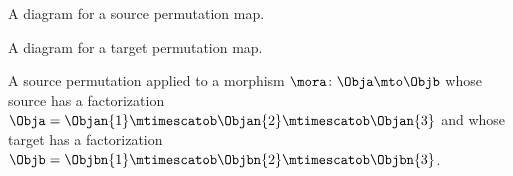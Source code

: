 \begin{marginfigure}
    \centering
    \caption{A diagram for a source permutation map.}
    \label{fig:symmetric-stacking-left-perm}
\end{marginfigure}

\begin{marginfigure}
    \centering
    \caption{A diagram for a target permutation map.}
\end{marginfigure}

\begin{marginfigure}
    \centering
    \caption{A source permutation applied to a morphism $\mora \colon \Obja \mto \Objb$ whose source has a factorization $\Obja = \Objan{1} \mtimescatob \Objan{2}  \mtimescatob \Objan{3}$ and whose target has a factorization $\Objb = \Objbn{1} \mtimescatob \Objbn{2}  \mtimescatob \Objbn{3}$.}
    \label{fig:symmetric-stacking-left-perm-evaluated}
\end{marginfigure}

